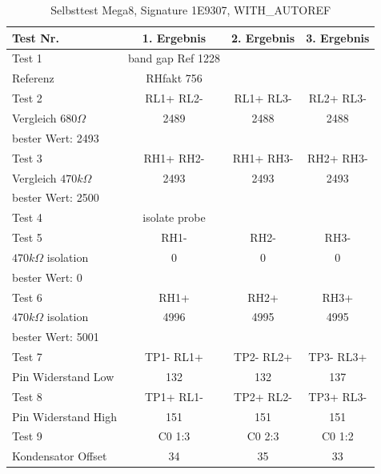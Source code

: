 \begin{table}[H]
  \begin{center}
    \begin{tabular}{| l | c | c | c |}
    \hline
Test Nr. & 1. Ergebnis & 2. Ergebnis & 3. Ergebnis \\
    \hline
    \hline
Test 1 & band gap Ref  1228 &  & \\
Referenz  & RHfakt 756 &  &  \\
    \hline
Test 2 & RL1+ RL2- & RL1+ RL3- & RL2+ RL3- \\
Vergleich \(680\Omega\) & 2489 & 2488 & 2488 \\
bester Wert: 2493 & & & \\
    \hline
Test 3 & RH1+ RH2- & RH1+ RH3- & RH2+ RH3- \\
Vergleich \(470k\Omega\) & 2493 & 2493 & 2493 \\
bester Wert: 2500 & & & \\
    \hline
Test 4 & isolate probe & & \\
    \hline
Test 5 & RH1- &  RH2- & RH3- \\
\(470k\Omega\) isolation & 0 & 0 & 0 \\
bester Wert: 0 & & & \\
    \hline
Test 6 & RH1+ & RH2+ & RH3+ \\
\(470k\Omega\) isolation & 4996 & 4995 & 4995 \\
bester Wert: 5001 & & & \\
    \hline
Test 7 & TP1- RL1+ & TP2- RL2+ & TP3- RL3+ \\
Pin Widerstand Low & 132 & 132 & 137 \\
    \hline
Test 8 & TP1+ RL1- & TP2+ RL2- & TP3+ RL3- \\
Pin Widerstand High & 151 & 151 & 151 \\
    \hline
Test 9 & C0  1:3 & C0  2:3 & C0 1:2 \\
Kondensator Offset & 34 & 35 & 33 \\
    \hline
    \end{tabular}
  \end{center}
  \caption{Selbsttest Mega8, Signature 1E9307, WITH\_AUTOREF}
  \label{tab:test_m8} 
\end{table}

